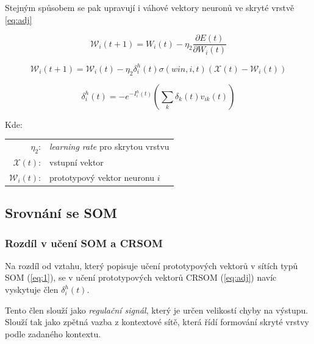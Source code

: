 \documentclass[thesis=M,czech]{FITthesis}[2012/06/26]
\begin{document}
    

Stejným spůsobem se pak upravují i váhové vektory neuronů ve skryté vrstvě \ref{eq:adj}
  
  \vspace{\baselineskip}
\noindent
  \begin{minipage}[c]{\textwidth }

\begin{equation*}
   \mathcal{W}_i(t+1)=W_i(t) -  \eta_2\frac{\partial{E(t)}}{\partial{W_i(t)}} 
\end{equation*}

\begin{equation}\label{eq:adj}
   \mathcal{W}_i(t+1)=\mathcal{W}_i(t) -  \eta_2\delta_i^h(t)\sigma(win, i, t)(\mathcal{X}(t) - \mathcal{W}_i(t))
\end{equation}

\begin{equation*}
   \delta_i^h(t)=-e^{-I_i^h(t)}(\sum\limits_k{\delta_k(t)v_{ik}(t)})
\end{equation*}



Kde:\\
\hspace*{3em}
\begin{tabular}{rl}
    $\eta_2$:& \textit{learning rate} pro skrytou vrstvu \\
        $\mathcal{X}(t)$:& vstupní vektor \\
            $\mathcal{W}_i(t)$:& prototypový vektor neuronu $i$ \\
\end{tabular}
\end{minipage} 
\vspace{\baselineskip}
\noindent
 

\subsection{Srovnání se SOM }
\subsubsection*{Rozdíl v učení SOM a CRSOM}
Na rozdíl od vztahu, který popisuje učení prototypových vektorů v sítích typů SOM (\ref{eq:1}), se v učení prototypových vektorů CRSOM (\ref{eq:adj}) navíc vyskytuje člen $\delta_i^h(t)$.

Tento člen slouží jako \textit{regulační signál}, který je určen velikostí chyby na výstupu. Slouží tak jako zpětná vazba z kontextové sítě, která řídí formování skryté vrstvy podle zadaného kontextu.
\end{document}
